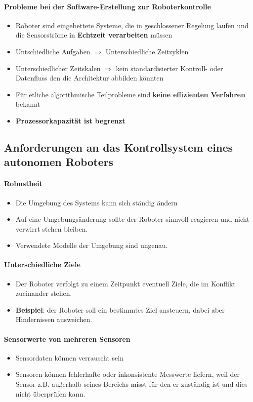 \paragraph{Probleme bei der Software-Erstellung zur Roboterkontrolle}
\begin{itemize}
	\item Roboter sind eingebettete Systeme, die in geschlossener Regelung laufen und die Sensorströme in \textbf{Echtzeit verarbeiten} müssen
	\item Untschiedliche Aufgaben $\Rightarrow$ Unterschiedliche Zeitzyklen
	\item Unterschiedlicher Zeitskalen $\Rightarrow$ kein standardisierter Kontroll- oder Datenfluss den die Architektur abbilden könnten
	\item Für etliche algorithmische Teilprobleme sind \textbf{keine effizienten Verfahren} bekannt
	\item \textbf{Prozessorkapazität ist begrenzt}
\end{itemize}
\subsection{Anforderungen an das Kontrollsystem eines autonomen Roboters}
\paragraph{Robustheit}
\begin{itemize}
	\item Die Umgebung des Systems kann sich ständig ändern
	\item Auf eine Umgebungsänderung sollte der Roboter sinnvoll reagieren und nicht verwirrt stehen bleiben.
	\item Verwendete Modelle der Umgebung sind ungenau.
\end{itemize}
\paragraph{Unterschiedliche Ziele}
\begin{itemize}
	\item Der Roboter verfolgt zu einem Zeitpunkt eventuell Ziele, die im Konflikt zueinander stehen.
	\item \textbf{Beispiel}: der Roboter soll ein bestimmtes Ziel ansteuern, dabei aber Hindernissen ausweichen.
\end{itemize}
\paragraph{Sensorwerte von mehreren Sensoren}
\begin{itemize}
	\item Sensordaten können verrauscht sein
	\item Sensoren können fehlerhafte oder inkonsistente Messwerte liefern, weil der Sensor z.B. außerhalb seines Bereichs misst für den er zuständig ist und dies nicht überprüfen kann.
\end{itemize}
